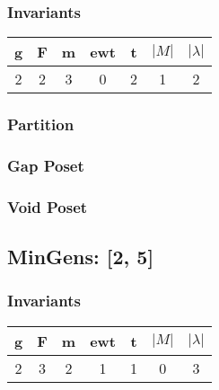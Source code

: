 \documentclass[a4paper]{article}
\begin{document}
\subsubsection*{Invariants}
\begin{minipage}{0.48\textwidth}
\begin{tabular}{|c|c|c|c|c|c|c|}
\toprule
g & F & m & ewt & t & \(|M|\) & \(|\lambda|\) \\
\midrule
2 & 2 & 3 & 0 & 2 & 1 & 2 \\
\bottomrule
\end{tabular}
\end{minipage}
\subsubsection*{Partition}
\begin{minipage}{0.48\textwidth}
\end{minipage}
\subsubsection*{Gap Poset}
\begin{minipage}{0.48\textwidth}
\end{minipage}
\subsubsection*{Void Poset}
\begin{minipage}{0.48\textwidth}
\end{minipage}
\newpage\subsection{MinGens: [2, 5]}
\subsubsection*{Invariants}
\begin{minipage}{0.48\textwidth}
\begin{tabular}{|c|c|c|c|c|c|c|}
\toprule
g & F & m & ewt & t & \(|M|\) & \(|\lambda|\) \\
\midrule
2 & 3 & 2 & 1 & 1 & 0 & 3 \\
\bottomrule
\end{tabular}
\end{minipage}
\end{document}
